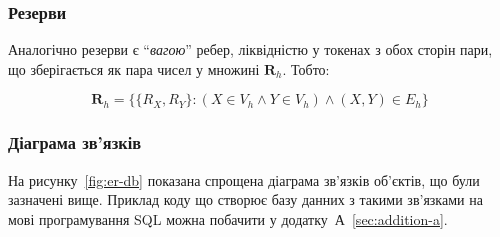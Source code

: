 \documentclass[../index.tex]{subfiles}
\begin{document}
\subsubsection{Резерви}

Аналогічно резерви є ``\textit{вагою}'' ребер, ліквідністю у токенах з обох сторін пари, що
зберігається як пара чисел у множині $\mathbf{R}_{h}$. Тобто:

\begin{equation*}
\mathbf{R}_{h} = \{ \{R_{X}, R_{Y}\}: (X \in V_{h} \land Y \in V_{h}) \land (X, Y) \in E_{h} \}
\end{equation*}

\subsubsection{Діаграма зв'язків}

На рисунку~\ref{fig:er-db} показана спрощена діаграма зв'язків об'єктів, що були
зазначені вище. Приклад коду що створює базу данних з такими зв'язками на мові
програмування SQL можна побачити у додатку~А~\ref{sec:addition-a}.
\end{document}
